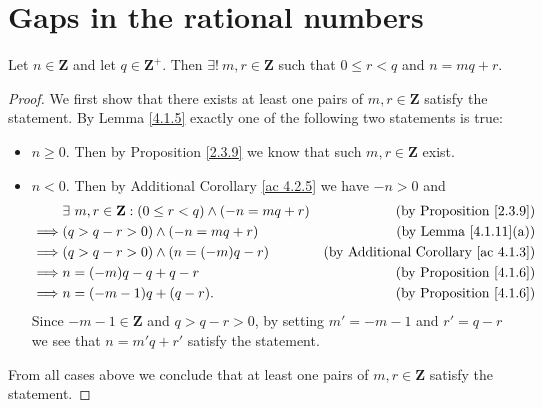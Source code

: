 \section{Gaps in the rational numbers}\label{sec 4.4}

\begin{additional corollary}\label{ac 4.4.1}
Let \(n \in \mathbf{Z}\) and let \(q \in \mathbf{Z}^+\).
Then \(\exists!\ m, r \in \mathbf{Z}\) such that \(0 \leq r < q\) and \(n = mq + r\).
\end{additional corollary}

\begin{proof}
    We first show that there exists at least one pairs of \(m, r \in \mathbf{Z}\) satisfy the statement.
    By Lemma \ref{4.1.5} exactly one of the following two statements is true:
    \begin{itemize}
        \item \(n \geq 0\).
              Then by Proposition \ref{2.3.9} we know that such \(m, r \in \mathbf{Z}\) exist.
        \item \(n < 0\).
              Then by Additional Corollary \ref{ac 4.2.5} we have \(-n > 0\) and
              \begin{align*}
                           & \exists\ m, r \in \mathbf{Z} : (0 \leq r < q) \land (-n = mq + r) & \text{(by Proposition \ref{2.3.9})}             \\
                  \implies & (q > q - r > 0) \land (-n = mq + r)                               & \text{(by Lemma \ref{4.1.11}(a))}               \\
                  \implies & (q > q - r > 0) \land (n = (-m)q - r)                             & \text{(by Additional Corollary \ref{ac 4.1.3})} \\
                  \implies & n = (-m)q - q + q - r                                             & \text{(by Proposition \ref{4.1.6})}             \\
                  \implies & n = (-m - 1)q + (q - r).                                          & \text{(by Proposition \ref{4.1.6})}
              \end{align*}
              Since \(-m - 1 \in \mathbf{Z}\) and \(q > q - r > 0\), by setting \(m' = -m - 1\) and \(r' = q - r\) we see that \(n = m'q + r'\) satisfy the statement.
    \end{itemize}
    From all cases above we conclude that at least one pairs of \(m, r \in \mathbf{Z}\) satisfy the statement.


\end{proof}
